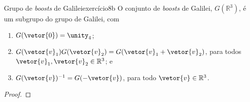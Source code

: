 \begin{proposition}{Grupo de \emph{boosts} de Galilei}{exercício8b}
    O conjunto de \emph{boosts} de Galilei, \(G(\mathbb{R}^3)\), é um subgrupo do grupo de Galilei, com
    \begin{enumerate}[label=(\alph*)]
        \item \(G(\vetor{0}) = \unity_4\);
        \item \(G(\vetor{v}_1)G(\vetor{v}_2) = G(\vetor{v}_1 + \vetor{v}_2)\), para todos \(\vetor{v}_1, \vetor{v}_2 \in \mathbb{R}^3\); e
        \item \(G(\vetor{v})^{-1} = G(-\vetor{v})\), para todo \(\vetor{v} \in \mathbb{R}^3\).
    \end{enumerate}
\end{proposition}
\begin{proof}

\end{proof}

